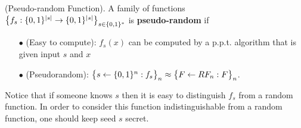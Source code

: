 \begin{definition}{(Pseudo-random Function).} \textnormal{\cite{ACI}}
  A family of functions $\big{\{} f_s: \{ 0,1 \}^{\lvert s \rvert} \rightarrow \{ 0,1 \}^{\lvert s \rvert} \big{\}}_{s \in \{ 0,1 \}^{*}}$ is \textbf{pseudo-random} if
  \begin{itemize}
    \item[$\bullet$] (Easy to compute): $f_s(x)$ can be computed by a p.p.t. algorithm that is given input $s$ and $x$
    \item[$\bullet$] (Pseudorandom): $\big{\{} s \leftarrow \{ 0,1 \}^n: f_s \big{\}}_n \approx \big{\{} F \leftarrow RF_n: F \big{\}}_n$.
  \end{itemize}
\end{definition}
Notice that if someone knows $s$ then it is easy to distinguish $f_s$ from a random function. In order to consider this function indistinguishable from a random function, one should keep seed $s$ secret.
%
%
%
%
